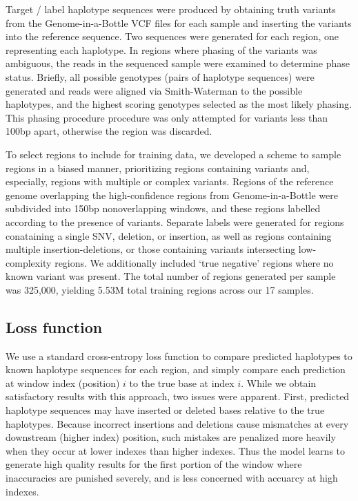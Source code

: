 \documentclass[]{article}
\begin{document}
Target / label haplotype sequences were produced by obtaining truth variants from the Genome-in-a-Bottle VCF files for each sample and inserting the variants into the reference sequence. Two sequences were generated for each region, one representing each haplotype. In regions where phasing of the variants was ambiguous, the reads in the sequenced sample were examined to determine phase status. Briefly, all possible genotypes (pairs of haplotype sequences) were generated and reads were aligned via Smith-Waterman to the possible haplotypes, and the highest scoring genotypes selected as the most likely phasing. This phasing procedure procedure was only attempted for variants less than 100bp apart, otherwise the region was discarded.

To select regions to include for training data, we developed a scheme to sample regions in a biased manner, prioritizing regions containing variants and, especially, regions with multiple or complex variants. Regions of the reference genome overlapping the high-confidence regions from Genome-in-a-Bottle were subdivided into 150bp nonoverlapping windows, and these regions labelled according to the presence of variants. Separate labels were generated for regions conataining a single SNV, deletion, or insertion, as well as regions containing multiple insertion-deletions, or those containing variants intersecting  low-complexity regions. We additionally included `true negative' regions where no known variant was present. The total number of regions generated per sample was 325,000, yielding 5.53M total training regions across our 17 samples.

\subsection{Loss function}

We use a standard cross-entropy loss function to compare predicted haplotypes to known haplotype sequences for each region, and simply compare each prediction at window index (position) $i$ to the true base at index $i$.  While we obtain satisfactory results with this approach, two issues were apparent. First, predicted haplotype sequences may have inserted or deleted bases relative to the true haplotypes. Because incorrect insertions and deletions cause mismatches at every downstream (higher index) position, such mistakes are penalized more heavily when they occur at lower indexes than higher indexes. Thus the model learns to generate high quality results for the first portion of the window where inaccuracies are punished severely, and is less concerned with accuarcy at high indexes. 
\end{document}
